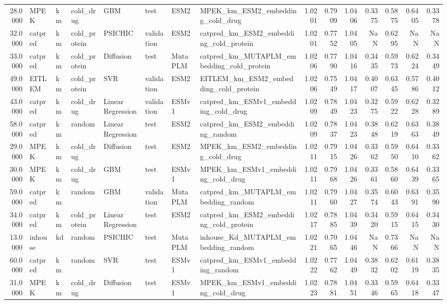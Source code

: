 \begin{tabular}{rlllllllrrrrrrr}
28.0000 & MPEK & km & cold_drug & GBM & test & ESM2 & MPEK_km_ESM2_embedding_cold_drug & 1.0201 & 0.7909 & 1.0406 & 0.3375 & 0.5875 & 0.6405 & 0.3378 \\
32.0000 & catpred & km & cold_protein & PSICHIC & validation & ESM2 & catpred_km_ESM2_embedding_cold_protein & 1.0201 & 0.7752 & 1.0405 & NaN & 0.6295 & NaN & NaN \\
33.0000 & catpred & km & cold_protein & Diffusion & test & MutaPLM & catpred_km_MUTAPLM_embedding_cold_protein & 1.0206 & 0.7790 & 1.0416 & 0.3435 & 0.5973 & 0.6224 & 0.3449 \\
49.0000 & EITLEM & km & cold_protein & SVR & validation & ESM2 & EITLEM_km_ESM2_embedding_cold_protein & 1.0206 & 0.7549 & 1.0417 & 0.4007 & 0.6345 & 0.5786 & 0.4012 \\
43.0000 & catpred & km & cold_drug & Linear Regression & validation & ESMv1 & catpred_km_ESMv1_embedding_cold_drug & 1.0209 & 0.7849 & 1.0423 & 0.3275 & 0.5922 & 0.6228 & 0.3289 \\
58.0000 & catpred & km & random & Linear Regression & test & ESM2 & catpred_km_ESM2_embedding_random & 1.0209 & 0.7837 & 1.0423 & 0.3848 & 0.6219 & 0.6363 & 0.3849 \\
29.0000 & MPEK & km & cold_drug & Diffusion & test & ESM2 & MPEK_km_ESM2_embedding_cold_drug & 1.0211 & 0.7915 & 1.0426 & 0.3362 & 0.5950 & 0.6410 & 0.3362 \\
30.0000 & MPEK & km & cold_drug & GBM & test & ESMv1 & MPEK_km_ESMv1_embedding_cold_drug & 1.0211 & 0.7968 & 1.0426 & 0.3361 & 0.5860 & 0.6439 & 0.3365 \\
59.0000 & catpred & km & random & GBM & validation & MutaPLM & catpred_km_MUTAPLM_embedding_random & 1.0211 & 0.7960 & 1.0427 & 0.3574 & 0.6043 & 0.6391 & 0.3590 \\
34.0000 & catpred & km & cold_protein & Linear Regression & test & ESM2 & catpred_km_ESM2_embedding_cold_protein & 1.0217 & 0.7885 & 1.0439 & 0.3420 & 0.5915 & 0.6415 & 0.3430 \\
13.0000 & inhouse & kd & random & PSICHIC & test & MutaPLM & inhouse_Kd_MUTAPLM_embedding_random & 1.0221 & 0.7065 & 1.0446 & NaN & 0.7366 & NaN & NaN \\
60.0000 & catpred & km & random & SVR & test & ESMv1 & catpred_km_ESMv1_embedding_random & 1.0222 & 0.7762 & 1.0449 & 0.3832 & 0.6202 & 0.6119 & 0.3835 \\
31.0000 & MPEK & km & cold_drug & Diffusion & test & ESMv1 & MPEK_km_ESMv1_embedding_cold_drug & 1.0223 & 0.7881 & 1.0451 & 0.3346 & 0.5965 & 0.6418 & 0.3347 \\

\end{tabular}
